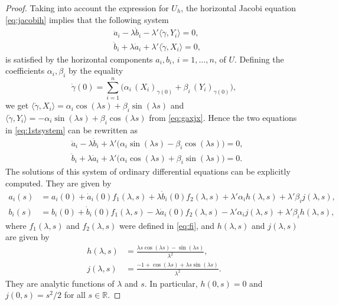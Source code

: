 \documentclass[10pt]{amsart}
\theoremstyle{definition}
\theoremstyle{remark}
\numberwithin{equation}{section}
\begin{document}
\begin{proof}
Taking into account the expression for $U_h$, the horizontal Jacobi equation  \eqref{eq:jacobih} implies that the following system
\begin{equation}
\label{eq:1stsystem}
\begin{split}
&\ddot{a}_i-{\lambda}\dot{b}_i-{\lambda}'{\langle{{\dot{\gamma}},Y_i}\rangle}=0,
\\
&\ddot{b}_i+{\lambda}\dot{a}_i+{\lambda}'{\langle{{\dot{\gamma}},X_i}\rangle}=0,
\end{split}
\end{equation}
is satisfied by the horizontal components $a_i,b_i$, $i=1,\ldots,n$, of $U$. Defining the coefficients $\alpha_i,\beta_i$ by the equality
\[
{\dot{\gamma}}(0)=\sum_{i=1}^n \big(\alpha_i\, (X_i)_{{\gamma}(0)}+\beta_i\, (Y_i)_{{\gamma}(0)}\big),
\]
we get ${\langle{{\dot{\gamma}},X_i}\rangle}=\alpha_i\cos({\lambda} s)+\beta_i\sin({\lambda} s)$ and ${\langle{{\dot{\gamma}},Y_i}\rangle}=-\alpha_i\sin({\lambda} s)+\beta_i\cos({\lambda} s)$ from \eqref{eq:gaxjx}. Hence the two equations in \eqref{eq:1stsystem} can be rewritten as
\begin{equation}
\label{eq:2ndsystem}
\begin{split}
&\ddot{a}_i-{\lambda}\dot{b}_i+{\lambda}'\big(\alpha_i\sin({\lambda} s)-\beta_i\cos({\lambda} s)\big)=0,
\\
&\ddot{b}_i+{\lambda}\dot{a}_i+{\lambda}'\big(\alpha_i\cos({\lambda} s)+\beta_i\sin({\lambda} s)\big)=0.
\end{split}
\end{equation}
The solutions of this system of ordinary differential equations can be explicitly computed. They are given by
\begin{equation}
\label{eq:a_ib_i}
\begin{split}
a_i(s)&=a_i(0)+\dot{a}_i(0)f_1({\lambda}, s)+{\lambda}\dot{b}_i(0)f_2({\lambda}, s)+{\lambda}'\alpha_ih({\lambda}, s)+{\lambda}'\beta_ij({\lambda}, s),
\\
b_i(s)&=b_i(0)+\dot{b}_i(0)f_1({\lambda}, s)-{\lambda}\dot{a}_i(0)f_2({\lambda}, s)-{\lambda}'\alpha_ij({\lambda}, s)+{\lambda}'\beta_ih({\lambda}, s),
\end{split}
\end{equation}
where $f_1({\lambda},s)$ and $f_2({\lambda},s)$ were defined in \eqref{eq:fi}, and $h({\lambda}, s)$ and $j({\lambda}, s)$ are given by
\begin{equation}
\label{eq:fghj}
\begin{split}
h({\lambda}, s)&=\frac{{\lambda} s\cos({\lambda} s)-\sin({\lambda} s)}{{\lambda}^2},
\\
j({\lambda}, s)&=\frac{-1+\cos({\lambda} s)+{\lambda} s\sin({\lambda} s)}{{\lambda}^2}.
\end{split}
\end{equation}
They are analytic functions of ${\lambda}$ and $s$. In particular, $h(0,s)=0$ and $j(0,s)=s^2/2$ for all $s\in{{\mathbb{R}}}$.


\end{proof}
\end{document}
